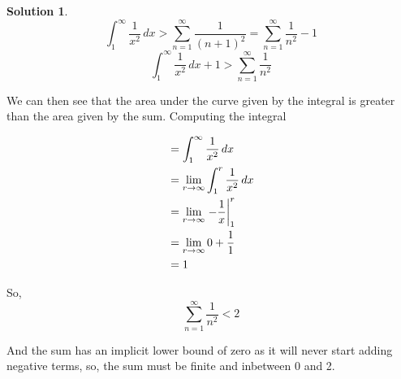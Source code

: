 \documentclass[10pt]{article}
\theoremstyle{definition}
\newtheorem{soln}{Solution}
\begin{document}
\begin{soln}
    $$\int_{1}^{\infty} \frac{1}{x^2} \,dx > \sum_{n = 1}^{\infty} \frac{1}{(n+1)^2}= \sum_{n = 1}^{\infty} \frac{1}{n^2}-1$$
    $$\int_{1}^{\infty} \frac{1}{x^2} \,dx + 1 > \sum_{n = 1}^{\infty} \frac{1}{n^2}$$

    \noindent We can then see that the area under the curve given by the integral is greater than the area given by the sum. Computing the integral

    \begin{align*}
         & = \int_{1}^{\infty} \frac{1}{x^2} \,dx                  \\
         & = \lim_{r \to \infty}  \int_{1}^{r} \frac{1}{x^2} \,dx  \\
         & = \lim_{r \to \infty}  \evaluated{-\frac{1}{x}}_{1}^{r} \\
         & = \lim_{r \to \infty}  0+\frac{1}{1}                    \\
         & = 1                                                     \\
    \end{align*}

    \noindent So,
    $$\sum_{n = 1}^{\infty} \frac{1}{n^2} < 2$$

    \noindent And the sum has an implicit lower bound of zero as it will never start adding negative terms, so, the sum must be finite and inbetween 0 and 2.
\end{soln}
\end{document}
